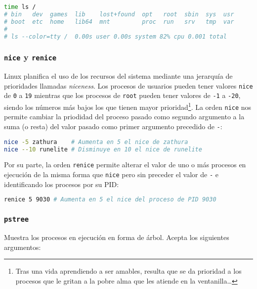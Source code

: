 \begin{lstlisting}[language=Bash]
time ls /
# bin   dev  games  lib    lost+found  opt   root  sbin  sys  usr
# boot  etc  home   lib64  mnt         proc  run   srv   tmp  var
#
# ls --color=tty /  0.00s user 0.00s system 82% cpu 0.001 total
\end{lstlisting}

\subsubsection{\texttt{nice} y \texttt{renice}}

Linux planifica el uso de los recursos del sistema mediante una jerarquía de prioridades llamadas \emph{niceness}.
Los procesos de usuarios pueden tener valores \texttt{nice} de \texttt{0} a \texttt{19} mientras que los procesos de \texttt{root} pueden tener valores de \texttt{-1} a \texttt{-20}, siendo los números más bajos los que tienen mayor prioridad\footnote{Tras una vida aprendiendo a ser amables, resulta que se da prioridad a los procesos que le gritan a la pobre alma que les atiende en la ventanilla\ldots}.
La orden \texttt{nice} nos permite cambiar la priodidad del proceso pasado como segundo argumento a la suma (o resta) del valor pasado como primer argumento precedido de \texttt{-}:

\begin{lstlisting}[language=Bash]
nice -5 zathura    # Aumenta en 5 el nice de zathura
nice --10 runelite # Disminuye en 10 el nice de runelite
\end{lstlisting}

Por su parte, la orden \texttt{renice} permite alterar el valor de uno o más procesos en ejecución de la misma forma que \texttt{nice} pero sin preceder el valor de \texttt{-} e identificando los procesos por su PID\@:

\begin{lstlisting}[language=Bash]
renice 5 9030 # Aumenta en 5 el nice del proceso de PID 9030
\end{lstlisting}

\subsubsection{\texttt{pstree}}

Muestra los procesos en ejecución en forma de árbol.
Acepta los siguientes argumentos:

